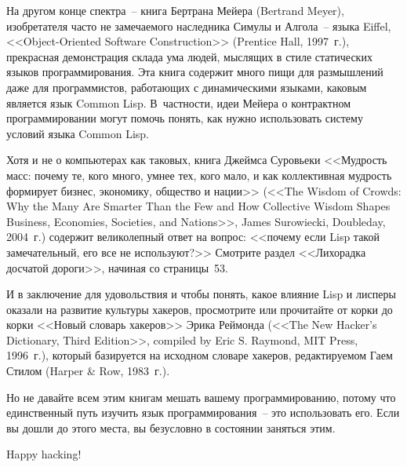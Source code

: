На другом конце спектра~-- книга Бертрана Мейера (Bertrand Meyer), изобретателя часто не
замечаемого наследника Симулы и Алгола~-- языка Eiffel, <<Object-Oriented Software
Construction>> (Prentice Hall, 1997~г.), прекрасная демонстрация склада ума людей, мыслящих в
стиле статических языков программирования. Эта книга содержит много пищи для размышлений
даже для программистов, работающих с динамическими языками, каковым является язык Common
Lisp.  В~частности, идеи Мейера о контрактном программировании могут помочь понять, как
нужно использовать систему условий языка Common Lisp.

Хотя и не о компьютерах как таковых, книга Джеймса Суровьеки <<Мудрость масс: почему те,
кого много, умнее тех, кого мало, и как коллективная мудрость формирует бизнес, экономику,
общество и нации>> (<<The Wisdom of Crowds: Why the Many Are Smarter Than the Few and How
Collective Wisdom Shapes Business, Economies, Societies, and Nations>>, James Surowiecki,
Doubleday, 2004~г.) содержит великолепный ответ на вопрос: <<почему если Lisp такой
замечательный, его все не используют?>> Смотрите раздел <<Лихорадка досчатой дороги>>,
начиная со страницы~53.

И в заключение для удовольствия и чтобы понять, какое влияние Lisp и лисперы оказали на
развитие культуры хакеров, просмотрите или прочитайте от корки до корки <<Новый словарь
хакеров>> Эрика Реймонда (<<The New Hacker's Dictionary, Third Edition>>, compiled by Eric
S. Raymond, MIT Press, 1996~г.), который базируется на исходном словаре хакеров, редактируемом
Гаем Стилом (Harper \& Row, 1983~г.).

Но не давайте всем этим книгам мешать вашему программированию, потому что единственный
путь изучить язык программирования~-- это использовать его. Если вы дошли до этого места,
вы безусловно в состоянии заняться этим.  

\vspace{0.5cm}

Happy hacking!


